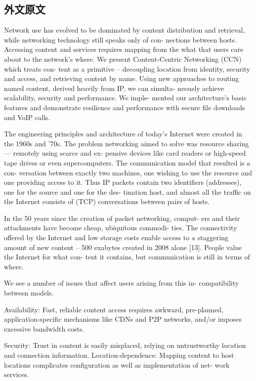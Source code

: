 \subsection{外文原文}
\par
Network use has evolved to be dominated by content distribution and retrieval, while networking technology still speaks only of con- nections between hosts. Accessing content and services requires mapping from the what that users care about to the network’s where. We present Content-Centric Networking (CCN) which treats con- tent as a primitive – decoupling location from identity, security and access, and retrieving content by name. Using new approaches to routing named content, derived heavily from IP, we can simulta- neously achieve scalability, security and performance. We imple- mented our architecture’s basic features and demonstrate resilience and performance with secure file downloads and VoIP calls.
\par
The engineering principles and architecture of today’s Internet were created in the 1960s and ’70s. The problem networking aimed to solve was resource sharing — remotely using scarce and ex- pensive devices like card readers or high-speed tape drives or even supercomputers. The communication model that resulted is a con- versation between exactly two machines, one wishing to use the resource and one providing access to it. Thus IP packets contain two identifiers (addresses), one for the source and one for the des- tination host, and almost all the traffic on the Internet consists of (TCP) conversations between pairs of hosts.
\par
In the 50 years since the creation of packet networking, comput- ers and their attachments have become cheap, ubiquitous commodi- ties. The connectivity offered by the Internet and low storage costs enable access to a staggering amount of new content – 500 exabytes created in 2008 alone [13]. People value the Internet for what con- tent it contains, but communication is still in terms of where.
\par
We see a number of issues that affect users arising from this in- compatibility between models.
\par
Availability: Fast, reliable content access requires awkward, pre-planned, application-specific mechanisms like CDNs and P2P networks, and/or imposes excessive bandwidth costs.
\par
Security: Trust in content is easily misplaced, relying on untrustworthy location and connection information.
Location-dependence: Mapping content to host locations complicates configuration as well as implementation of net- work services.

